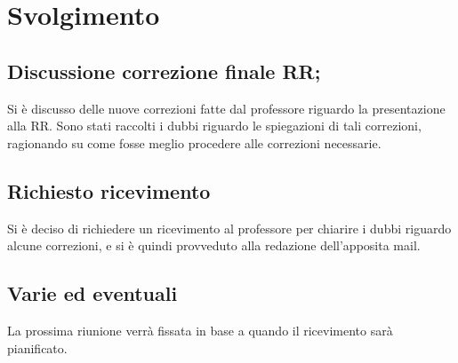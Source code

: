 \documentclass[]{article}
\begin{document}
	\newpage

	\section{Svolgimento}
		\subsection{Discussione correzione finale RR;}
		Si è discusso delle nuove correzioni fatte dal professore riguardo la presentazione alla RR.
		Sono stati raccolti i dubbi riguardo le spiegazioni di tali correzioni, ragionando su come fosse meglio procedere alle correzioni necessarie.\\
		
		\subsection{Richiesto ricevimento}
		Si è deciso di richiedere un ricevimento al professore per chiarire i dubbi riguardo alcune correzioni, e si è quindi provveduto alla redazione dell'apposita mail.\\
		
		\subsection{Varie ed eventuali}
		La prossima riunione verrà fissata in base a quando il ricevimento sarà pianificato.\\
	
\end{document}
